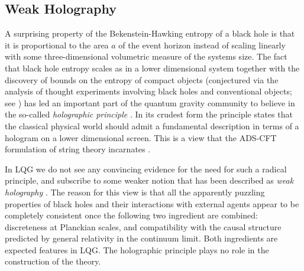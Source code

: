 \documentclass[aps, nofootinbib,superscriptaddress,12pt]{revtex4-2}
\begin{document}
\subsection{Weak Holography}\label{intro-holo}

A surprising property of the Bekenstein-Hawking entropy of a black hole is that it is proportional to the area $a$ of the event horizon instead of scaling linearly with some three-dimensional volumetric measure of the systems size. The fact that black hole entropy scales as in a lower dimensional system together with the discovery of bounds on the entropy of compact objects (conjectured via the analysis of thought experiments involving black holes and conventional objects; see \cite{Bekenstein:1980jp, Bekenstein:1984vm, Bekenstein:1983iq, Unruh:1983ir, Marolf:2003wu}) has led an important part of the quantum gravity community to believe in the so-called {\em holographic principle} \cite{Bousso:2002ju}. In its crudest form the principle states that the classical  physical world should admit a fundamental description in terms of a hologram on a lower dimensional screen. This is a view that the  ADS-CFT formulation of string theory incarnates \cite{Maldacena:1997re}. 


In LQG we do not see any convincing evidence for the need for such a radical principle, and subscribe to some weaker 
notion that has been described as {\em weak holography} \cite{Smolin:2000ag}. 
The reason for this view is that all the apparently puzzling properties of black holes and their interactions with external agents appear to be completely consistent once  the following two ingredient are combined:
discreteness at Planckian scales, and compatibility with the causal structure predicted by general relativity in the continuum limit. Both ingredients are expected features in LQG.  The holographic principle plays no role in the construction of the theory.
\end{document}

